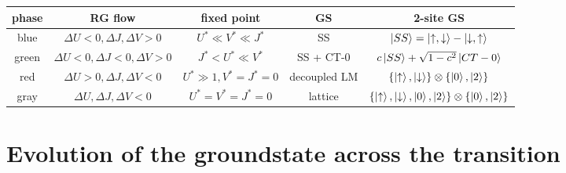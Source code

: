 \begin{center}
\begin{tabular}{|c|c|c|c|c|}
\hline
phase & RG flow & fixed point & GS & 2-site GS \\ 
\hline
blue & \(\Delta U <0, \Delta J,\Delta V>0\) & \(U^* \ll V^* \ll J^*\) & SS & \(\ket{SS}=\ket{\uparrow,\downarrow} - \ket{\downarrow, \uparrow}\)  \\ 
green &  \(\Delta U < 0, \Delta J < 0,\Delta V>0\) & \(J^* < U^* \ll V^*\) & SS + CT-0 & \(c\ket{SS} + \sqrt{1-c^2}\ket{CT-0}\)  \\  
red &  \(\Delta U > 0, \Delta J,\Delta V<0\) & \(U^* \gg 1,  V^* = J^* = 0\) & decoupled LM & \(\left\{\ket{\uparrow}, \ket{\downarrow} \right\} \otimes \left\{\ket{0}, \ket{2}\right\} \) \\
gray &  \(\Delta U, \Delta J,\Delta V < 0\) & \(U^* = V^* = J^* = 0\) & lattice & \(\left\{\ket{\uparrow}, \ket{\downarrow}, \ket{0}, \ket{2} \right\} \otimes \left\{\ket{0}, \ket{2}\right\}\) \\
\hline
\end{tabular}
\end{center}

\section{Evolution of the groundstate across the transition}


